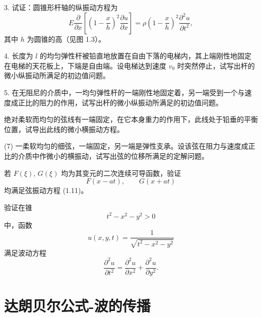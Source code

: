 \begin{exercise}
3. 试证：圆锥形杆轴的纵振动方程为
\[
E \frac{\partial}{\partial x}\left[\left(1-\frac{x}{h}\right)^2 \frac{\partial u}{\partial x}\right]
= \rho \left(1-\frac{x}{h}\right)^2 \frac{\partial^2 u}{\partial t^2},
\]
其中 $h$ 为圆锥的高（见图 1.3）。
\end{exercise}

\begin{exercise}
4. 长度为 $l$ 的均匀弹性杆被铅直地放置在自由下落的电梯内，其上端刚性地固定在电梯的天花板上，下端是自由端。设电梯达到速度 $v_0$ 时突然停止，试写出杆的微小纵振动所满足的初边值问题。
\end{exercise}

\begin{exercise}
5. 在无阻尼的介质中，一均匀弹性杆的一端刚性地固定着，另一端受到一个与速度成正比的阻力的作用，试写出杆的微小纵振动所满足的初边值问题。
\end{exercise}
\begin{exercise}
绝对柔软而均匀的弦线有一端固定，在它本身重力的作用下，此线处于铅垂的平衡位置，试导出此线的微小横振动方程。
\end{exercise}
\begin{exercise}(7)
一柔软均匀的细弦，一端固定，另一端是弹性支承。设该弦在阻力与速度成正比的介质中作微小的横振动，试写出弦的位移所满足的定解问题。
\end{exercise}
\begin{exercise}
若 $F(\xi),\,G(\xi)$ 均为其变元的二次连续可导函数，验证
\[
F(x-at), \qquad G(x+at)
\]
均满足弦振动方程 (1.11)。
\end{exercise}

\begin{exercise}
验证在锥
\[
t^{2}-x^{2}-y^{2} > 0
\]
中，函数
\[
u(x,y,t) = \frac{1}{\sqrt{t^{2}-x^{2}-y^{2}}}
\]
满足波动方程
\[
\frac{\partial^{2}u}{\partial t^{2}}
= \frac{\partial^{2}u}{\partial x^{2}}
+ \frac{\partial^{2}u}{\partial y^{2}}.
\]
\end{exercise}
\section{达朗贝尔公式-波的传播}

